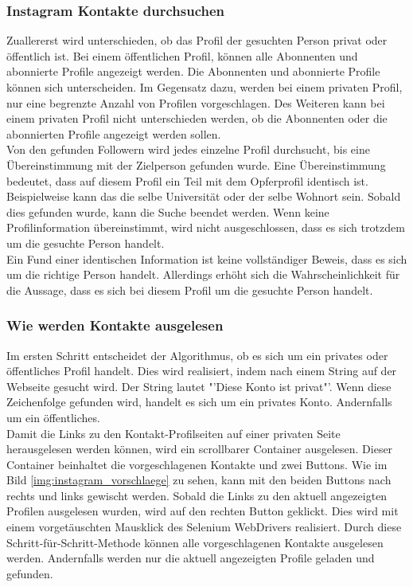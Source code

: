 		\subsubsection{Instagram Kontakte durchsuchen} 
		Zuallererst wird unterschieden, ob das Profil der gesuchten Person privat oder öffentlich ist. Bei einem öffentlichen Profil, können alle Abonnenten und abonnierte Profile angezeigt werden. Die Abonnenten und abonnierte Profile können sich unterscheiden. Im Gegensatz dazu, werden bei einem privaten Profil, nur eine begrenzte Anzahl von Profilen vorgeschlagen. Des Weiteren kann bei einem privaten Profil nicht unterschieden werden, ob die Abonnenten oder die abonnierten Profile angezeigt werden sollen.\\
		Von den gefunden Followern wird jedes einzelne Profil durchsucht, bis eine Übereinstimmung mit der Zielperson gefunden wurde. Eine Übereinstimmung bedeutet, dass auf diesem Profil ein Teil mit dem Opferprofil identisch ist. Beispielweise kann das die selbe Universität oder der selbe Wohnort sein. Sobald dies gefunden wurde, kann die Suche beendet werden. Wenn keine Profilinformation übereinstimmt, wird nicht ausgeschlossen, dass es sich trotzdem um die gesuchte Person handelt.\\
		Ein Fund einer identischen Information ist keine vollständiger Beweis, dass es sich um die richtige Person handelt. Allerdings erhöht sich die Wahrscheinlichkeit für die Aussage, dass es sich bei diesem Profil um die gesuchte Person handelt.
		
		\subsubsection{Wie werden Kontakte ausgelesen}
		Im ersten Schritt entscheidet der Algorithmus, ob es sich um ein privates oder öffentliches Profil handelt. Dies wird realisiert, indem nach einem String auf der Webseite gesucht wird. Der String lautet "'Diese Konto ist privat"'. Wenn diese Zeichenfolge gefunden wird, handelt es sich um ein privates Konto. Andernfalls um ein öffentliches.\\
		Damit die Links zu den Kontakt-Profilseiten auf einer privaten Seite herausgelesen werden können, wird ein scrollbarer Container ausgelesen. Dieser Container beinhaltet die vorgeschlagenen Kontakte und zwei Buttons. Wie im Bild \ref{img:instagram_vorschlaege} zu sehen, kann mit den beiden Buttons nach rechts und links gewischt werden. Sobald die Links zu den aktuell angezeigten Profilen ausgelesen wurden, wird auf den rechten Button geklickt. Dies wird mit einem vorgetäuschten Mausklick des Selenium WebDrivers realisiert. Durch diese Schritt-für-Schritt-Methode können alle vorgeschlagenen Kontakte ausgelesen werden. Andernfalls werden nur die aktuell angezeigten Profile geladen und gefunden.
		 
